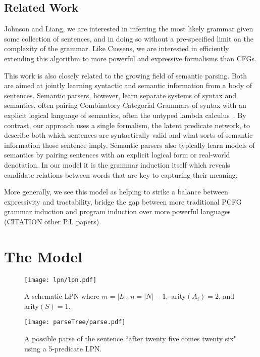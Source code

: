 \documentclass[11pt, twocolumn]{article}
\begin{document}
\subsection{Related Work}
Johnson and Liang, we are interested in inferring the most likely
grammar given some collection of sentences, and in doing so without a
pre-specified limit on the complexity of the grammar. Like Cussens, we
are interested in efficiently extending this algorithm to more
powerful and expressive formalisms than CFGs.

This work is also closely related to the growing field of semantic
parsing. Both are aimed at jointly learning syntactic and semantic
information from a body of sentences. Semantic parsers, however, learn
separate systems of syntax and semantics, often pairing Combinatory
Categorial Grammars of syntax with an explicit logical language of
semantics, often the untyped lambda
calculus~\cite{berant2013semantic,liang2013learning,kwiatkowski2010inducing}. By
contrast, our approach uses a single formalism, the latent predicate
network, to describe both which sentences are syntactically valid and
what sorts of semantic information those sentence imply. Semantic
parsers also typically learn models of semantics by pairing sentences
with an explicit logical form or real-world denotation. In our model
it is the grammar induction itself which reveals candidate relations
between words that are key to capturing their meaning.

More generally, we see this model as helping to strike a balance between expressivity and tractability, bridge the gap between more traditional PCFG grammar induction and program induction over more powerful languages~\cite{dechter2013bootstrap,} (CITATION other P.I. papers).

\section{The Model}

\begin{figure}[t]
		\texttt{[image: lpn/lpn.pdf]}
		\caption{A schematic LPN where $m = |L|,\, n = |N|-1$,\, arity$(A_i) = 2$, and arity$(S) = 1$.}
		\label{fig:schematic}
\end{figure}

\begin{figure}[t]
		\texttt{[image: parseTree/parse.pdf]}
		\caption{A possible parse of the sentence ``after twenty five comes twenty six" using a 5-predicate LPN.}
\end{figure}
\end{document}
